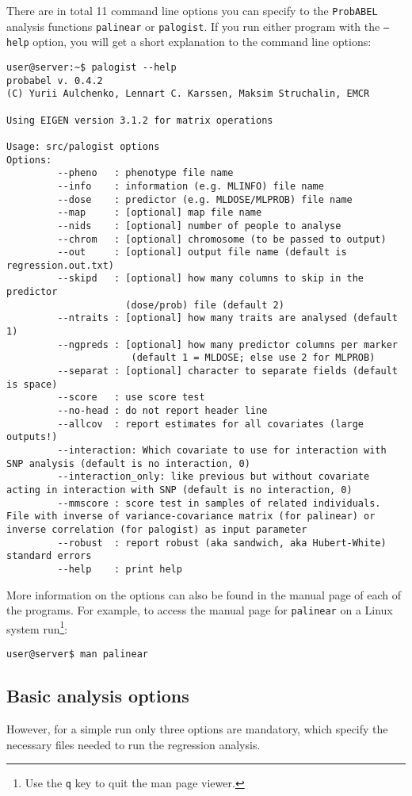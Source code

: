 \documentclass[12pt,a4paper]{article}
\newcommand{\PA}{\texttt{ProbABEL}}
\begin{document}
There are in total 11 command line options you can specify to the
\PA{} analysis functions \texttt{palinear} or \texttt{palogist}. If
you run either program with the \texttt{--help} option, you will get a
short explanation to the command line options:
\begin{verbatim}
user@server:~$ palogist --help
probabel v. 0.4.2
(C) Yurii Aulchenko, Lennart C. Karssen, Maksim Struchalin, EMCR

Using EIGEN version 3.1.2 for matrix operations

Usage: src/palogist options
Options:
         --pheno   : phenotype file name
         --info    : information (e.g. MLINFO) file name
         --dose    : predictor (e.g. MLDOSE/MLPROB) file name
         --map     : [optional] map file name
         --nids    : [optional] number of people to analyse
         --chrom   : [optional] chromosome (to be passed to output)
         --out     : [optional] output file name (default is regression.out.txt)
         --skipd   : [optional] how many columns to skip in the predictor
                     (dose/prob) file (default 2)
         --ntraits : [optional] how many traits are analysed (default 1)
         --ngpreds : [optional] how many predictor columns per marker
                      (default 1 = MLDOSE; else use 2 for MLPROB)
         --separat : [optional] character to separate fields (default is space)
         --score   : use score test
         --no-head : do not report header line
         --allcov  : report estimates for all covariates (large outputs!)
         --interaction: Which covariate to use for interaction with SNP analysis (default is no interaction, 0)
         --interaction_only: like previous but without covariate acting in interaction with SNP (default is no interaction, 0)
         --mmscore : score test in samples of related individuals. File with inverse of variance-covariance matrix (for palinear) or inverse correlation (for palogist) as input parameter
         --robust  : report robust (aka sandwich, aka Hubert-White) standard errors
         --help    : print help
\end{verbatim}
More information on the options can also be found in the manual page
of each of the programs. For example, to access the manual page for
\texttt{palinear} on a Linux system run\footnote{Use the \texttt{q}
  key to quit the man page viewer.}:
\begin{verbatim}
user@server$ man palinear
\end{verbatim}


\subsection{Basic analysis options}
However, for a simple run only three options are mandatory, which
specify the necessary files needed to run the regression analysis.
\end{document}
